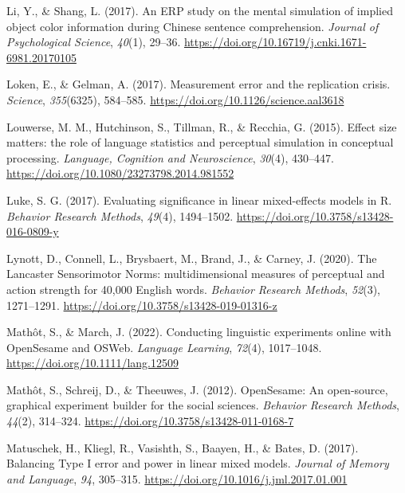 \documentclass[
  man,mask,floatsintext]{apa7}
\newlength{\cslhangindent}
\newlength{\cslentryspacingunit} %
\newenvironment{CSLReferences}[2] %
 {%
  \setlength{\parindent}{0pt}
  \ifodd #1
  \let\oldpar\par
  \def\par{\hangindent=\cslhangindent\oldpar}
  \fi
  \setlength{\parskip}{#2\cslentryspacingunit}
 }%
 {}
\begin{document}
\begin{CSLReferences}{1}{0}
\leavevmode{}%
Li, Y., \& Shang, L. (2017). {An ERP study on the mental simulation of implied object color information during Chinese sentence comprehension}. \emph{Journal of Psychological Science}, \emph{40}(1), 29--36. \url{https://doi.org/10.16719/j.cnki.1671-6981.20170105}

\leavevmode{}%
Loken, E., \& Gelman, A. (2017). Measurement error and the replication crisis. \emph{Science}, \emph{355}(6325), 584--585. \url{https://doi.org/10.1126/science.aal3618}

\leavevmode{}%
Louwerse, M. M., Hutchinson, S., Tillman, R., \& Recchia, G. (2015). Effect size matters: the role of language statistics and perceptual simulation in conceptual processing. \emph{Language, Cognition and Neuroscience}, \emph{30}(4), 430--447. \url{https://doi.org/10.1080/23273798.2014.981552}

\leavevmode{}%
Luke, S. G. (2017). Evaluating significance in linear mixed-effects models in {R}. \emph{Behavior Research Methods}, \emph{49}(4), 1494--1502. \url{https://doi.org/10.3758/s13428-016-0809-y}

\leavevmode{}%
Lynott, D., Connell, L., Brysbaert, M., Brand, J., \& Carney, J. (2020). The Lancaster Sensorimotor Norms: multidimensional measures of perceptual and action strength for 40,000 English words. \emph{Behavior Research Methods}, \emph{52}(3), 1271--1291. \url{https://doi.org/10.3758/s13428-019-01316-z}

\leavevmode{}%
Mathôt, S., \& March, J. (2022). Conducting {linguistic} {experiments} {online} {with} {OpenSesame} and {OSWeb}. \emph{Language Learning}, \emph{72}(4), 1017--1048. \url{https://doi.org/10.1111/lang.12509}

\leavevmode{}%
Mathôt, S., Schreij, D., \& Theeuwes, J. (2012). {OpenSesame}: {An} open-source, graphical experiment builder for the social sciences. \emph{Behavior Research Methods}, \emph{44}(2), 314--324. \url{https://doi.org/10.3758/s13428-011-0168-7}

\leavevmode{}%
Matuschek, H., Kliegl, R., Vasishth, S., Baayen, H., \& Bates, D. (2017). Balancing Type I error and power in linear mixed models. \emph{Journal of Memory and Language}, \emph{94}, 305--315. \url{https://doi.org/10.1016/j.jml.2017.01.001}


\end{CSLReferences}
\end{document}
